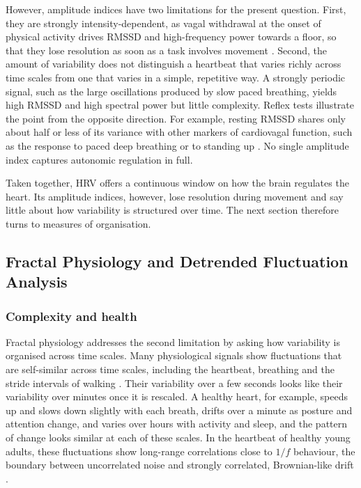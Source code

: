 However, amplitude indices have two limitations for the present question. First, they are strongly intensity-dependent, as vagal withdrawal at the onset of physical activity drives RMSSD and high-frequency power towards a floor, so that they lose resolution as soon as a task involves movement \citep{gronwald2020biomarker}. Second, the amount of variability does not distinguish a heartbeat that varies richly across time scales from one that varies in a simple, repetitive way. A strongly periodic signal, such as the large oscillations produced by slow paced breathing, yields high RMSSD and high spectral power but little complexity. Reflex tests illustrate the point from the opposite direction. For example, resting RMSSD shares only about half or less of its variance with other markers of cardiovagal function, such as the response to paced deep breathing or to standing up \citep{blalock2026}. No single amplitude index captures autonomic regulation in full.

Taken together, HRV offers a continuous window on how the brain regulates the heart. Its amplitude indices, however, lose resolution during movement and say little about how variability is structured over time. The next section therefore turns to measures of organisation.

\subsection{Fractal Physiology and Detrended Fluctuation Analysis}
\label{sec:bg-dfa}

\subsubsection{Complexity and health}

Fractal physiology addresses the second limitation by asking how variability is organised across time scales. Many physiological signals show fluctuations that are self-similar across time scales, including the heartbeat, breathing and the stride intervals of walking \citep{goldberger2002,hausdorff1997}. Their variability over a few seconds looks like their variability over minutes once it is rescaled. A healthy heart, for example, speeds up and slows down slightly with each breath, drifts over a minute as posture and attention change, and varies over hours with activity and sleep, and the pattern of change looks similar at each of these scales. In the heartbeat of healthy young adults, these fluctuations show long-range correlations close to $1/f$ behaviour, the boundary between uncorrelated noise and strongly correlated, Brownian-like drift \citep{peng1995,goldberger2002}.

